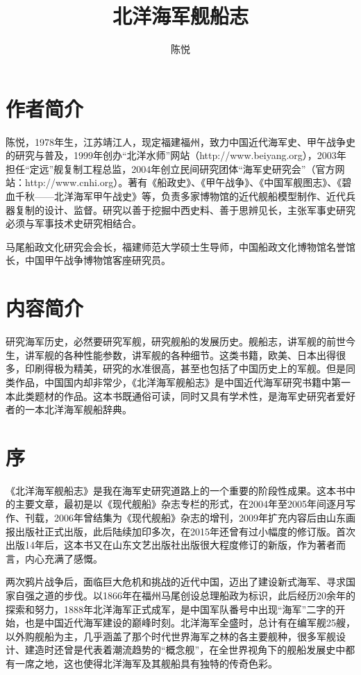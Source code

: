 \documentclass[12pt,UTF8]{ctexbook}
\title{\heiti\zihao{0} 北洋海军舰船志}
\author{陈悦}
\date{}
\begin{document}
\maketitle
\tableofcontents

\frontmatter

\chapter{作者简介}

陈悦，1978年生，江苏靖江人，现定福建福州，致力中国近代海军史、甲午战争史的研究与普及，1999年创办“北洋水师”网站（http://www.beiyang.org），2003年担任“定远”舰复制工程总监，2004年创立民间研究团体“海军史研究会”（官方网站：http://www.cnhi.org）。著有《船政史》、《甲午战争》、《中国军舰图志》、《碧血千秋——北洋海军甲午战史》等，负责多家博物馆的近代舰船模型制作、近代兵器复制的设计、监督。研究以善于挖掘中西史料、善于思辨见长，主张军事史研究必须与军事技术史研究相结合。

马尾船政文化研究会会长，福建师范大学硕士生导师，中国船政文化博物馆名誉馆长，中国甲午战争博物馆客座研究员。

\chapter{内容简介}

研究海军历史，必然要研究军舰，研究舰船的发展历史。舰船志，讲军舰的前世今生，讲军舰的各种性能参数，讲军舰的各种细节。这类书籍，欧美、日本出得很多，印刷得极为精美，研究的水准很高，甚至也包括了中国历史上的军舰。但是同类作品，中国国内却非常少，《北洋海军舰船志》是中国近代海军研究书籍中第一本此类题材的作品。这本书既通俗可读，同时又具有学术性，是海军史研究者爱好者的一本北洋海军舰船辞典。

\chapter{序}

《北洋海军舰船志》是我在海军史研究道路上的一个重要的阶段性成果。这本书中的主要文章，最初是以《现代舰船》杂志专栏的形式，在2004年至2005年间逐月写作、刊载，2006年曾结集为《现代舰船》杂志的增刊，2009年扩充内容后由山东画报出版社正式出版，此后陆续加印多次，在2015年还曾有过小幅度的修订版。首次出版14年后，这本书又在山东文艺出版社出版很大程度修订的新版，作为著者而言，内心充满了感慨。

两次鸦片战争后，面临巨大危机和挑战的近代中国，迈出了建设新式海军、寻求国家自强之道的步伐。以1866年在福州马尾创设总理船政为标识，此后经历20余年的探索和努力，1888年北洋海军正式成军，是中国军队番号中出现“海军”二字的开始，也是中国近代海军建设的巅峰时刻。北洋海军全盛时，总计有在编军舰25艘，以外购舰船为主，几乎涵盖了那个时代世界海军之林的各主要舰种，很多军舰设计、建造时还曾是代表着潮流趋势的“概念舰”，在全世界视角下的舰船发展史中都有一席之地，这也使得北洋海军及其舰船具有独特的传奇色彩。
\end{document}
